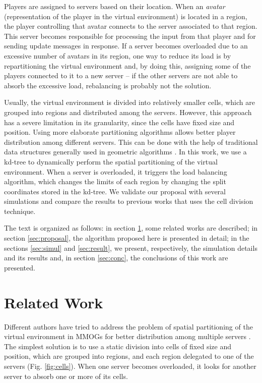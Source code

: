 \documentclass[acmjacm]{acmtrans2m}
\newcommand{\figurecaption}{Fig.}
\begin{document}
Players are assigned to servers based on their location. When an \emph{avatar} (representation of the player in the virtual environment) is located in a region, the player controlling that avatar connects to the server associated to that region. This server becomes responsible for processing the input from that player and for sending update messages in response. If a server becomes overloaded due to an excessive number of avatars in its region, one way to reduce its load is by repartitioning the virtual environment and, by doing this, assigning some of the players connected to it to a new server -- if the other servers are not able to absorb the excessive load, rebalancing is probably not the solution.

Usually, the virtual environment is divided into relatively smaller cells, which are grouped into regions and distributed among the servers. However, this approach has a severe limitation in its granularity, since the cells have fixed size and position. Using more elaborate partitioning algorithms allows better player distribution among different servers. This can be done with the help of traditional data structures generally used in geometric algorithms \cite{samet2005}. In this work, we use a kd-tree to dynamically perform the spatial partitioning of the virtual environment. When a server is overloaded, it triggers the load balancing algorithm, which changes the limits of each region by changing the split coordinates stored in the kd-tree. We validate our proposal with several simulations and compare the results to previous works that uses the cell division technique.

The text is organized as follows: in section \ref{context}, some related works are described; in section \ref{sec:proposal}, the algorithm proposed here is presented in detail; in the sections \ref{sec:simul} and \ref{sec:result}, we present, respectively, the simulation details and its results and, in section \ref{sec:conc}, the conclusions of this work are presented.


\section{Related Work}
\label{context}

Different authors have tried to address the problem of spatial partitioning of the virtual environment in MMOGs for better distribution among multiple servers \cite{ahmed2008mol,bezerra2009lbs}. The simplest solution is to use a static division into cells of fixed size and position, which are grouped into regions, and each region delegated to one of the servers (\figurecaption{} \ref{fig:cells}). When one server becomes overloaded, it looks for another server to absorb one or more of its cells.
\end{document}
